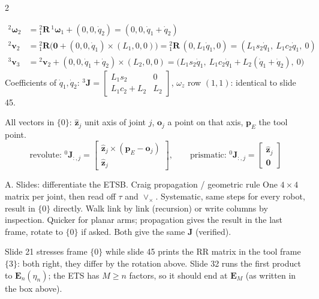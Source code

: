 \begin{multicols}{2}
\begin{deriv}
\begin{align*}
{}^2\boldsymbol\omega_2&={}^2_1\mathbf R\,{}^1\boldsymbol\omega_1+(0,0,\dot q_2)=(0,0,\dot q_1+\dot q_2)\\
{}^2\mathbf v_2&={}^2_1\mathbf R\big(\mathbf 0+(0,0,\dot q_1)\times(L_1,0,0)\big)={}^2_1\mathbf R\,(0,L_1\dot q_1,0)=(L_1s_2\dot q_1,\ L_1c_2\dot q_1,\ 0)\\
{}^3\mathbf v_3&={}^2\mathbf v_2+(0,0,\dot q_1+\dot q_2)\times(L_2,0,0)=\big(L_1s_2\dot q_1,\ L_1c_2\dot q_1+L_2(\dot q_1+\dot q_2),\ 0\big)
\end{align*}
Coefficients of $\dot q_1,\dot q_2$: ${}^3\mathbf J=\begin{bmatrix}L_1s_2&0\\L_1c_2+L_2&L_2\end{bmatrix}$, $\omega_z$ row $(1,1)$: identical to slide 45. \chk
\end{deriv}
\begin{fbx}
All vectors in $\{0\}$: $\hat{\mathbf z}_j$ unit axis of joint $j$, $\mathbf o_j$ a point on that axis, $\mathbf p_E$ the tool point.
\[\text{revolute: }{}^0\mathbf J_{:,j}=\begin{bmatrix}\hat{\mathbf z}_j\times(\mathbf p_E-\mathbf o_j)\\\hat{\mathbf z}_j\end{bmatrix},\qquad\text{prismatic: }{}^0\mathbf J_{:,j}=\begin{bmatrix}\hat{\mathbf z}_j\\\mathbf 0\end{bmatrix}\]
\end{fbx}
\begin{twoway}{A. Slides: differentiate the ETS}{B. Craig propagation / geometric rule}
One $4\times4$ matrix per joint, then read off $\tau$ and $\vee_\times$. Systematic, same steps for every robot, result in $\{0\}$ directly.
\tcblower
Walk link by link (recursion) or write columns by inspection. Quicker for planar arms; propagation gives the result in the last frame, rotate to $\{0\}$ if asked. Both give the same $\mathbf J$ (verified).
\end{twoway}
\begin{slideerr}
Slide 21 stresses frame $\{0\}$ while slide 45 prints the RR matrix in the tool frame $\{3\}$: both right, they differ by the rotation above. Slide 32 runs the first product to $\mathbf E_n(\eta_n)$; the ETS has $M\ge n$ factors, so it should end at $\mathbf E_M$ (as written in the box above).
\end{slideerr}


\end{multicols}
